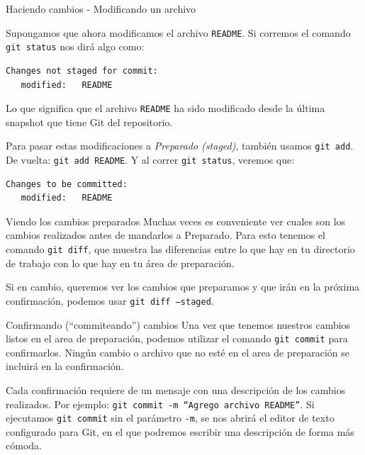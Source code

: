 \documentclass{beamer}
\begin{document}
\begin{frame}[fragile]{Haciendo cambios - Modificando un archivo}

    Supongamos que ahora modificamos el archivo \texttt{README}.
    Si corremos el comando \texttt{git status} nos dirá algo como:
    \begin{verbatim}
Changes not staged for commit:
   modified:   README
    \end{verbatim}
    Lo que significa que el archivo \texttt{README} ha sido modificado desde la última
    snapshot que tiene Git del repositorio.

    Para pasar estas modificaciones a \textit{Preparado (staged)}, también usamos \texttt{git add}. De vuelta: \texttt{git add README}.
    Y al correr \texttt{git status}, veremos que:
    \begin{verbatim}
Changes to be committed:
   modified:   README
    \end{verbatim}

\end{frame}

\begin{frame}[fragile]{Viendo los cambios preparados}
    Muchas veces es conveniente ver cuales son los cambios realizados antes de mandarlos a Preparado.
    Para esto tenemos el comando \texttt{git diff}, que muestra las diferencias entre lo que hay en
    tu directorio de trabajo con lo que hay en tu área de preparación.

    \vspace{1em}

    Si en cambio, queremos ver los cambios que preparamos y que irán en la próxima confirmación, podemos usar \texttt{git diff --staged}.

\end{frame}

\begin{frame}{Confirmando (``commiteando'') cambios}
    Una vez que tenemos nuestros cambios listos en el area de preparación, podemos
    utilizar el comando \texttt{git commit} para confirmarlos. Ningún cambio o archivo
    que no esté en el area de preparación se incluirá en la confirmación.

    \vspace{1em}

    Cada confirmación requiere de un mensaje con una descripción de los cambios realizados.
    Por ejemplo: \texttt{git commit -m ``Agrego archivo README''}. Si ejecutamos
    \texttt{git commit} sin el parámetro \texttt{-m}, se nos abrirá el editor de texto configurado para Git,
    en el que podremos escribir una descripción de forma más cómoda.

\end{frame}
\end{document}
